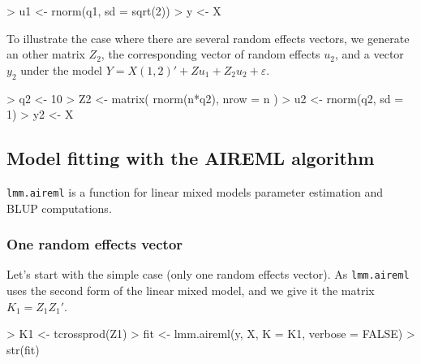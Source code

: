 \documentclass{article}
\renewenvironment{Schunk}{\vspace{\topsep}}{\vspace{\topsep}}
\begin{document}
\begin{Schunk}
\begin{Sinput}
> u1 <- rnorm(q1, sd = sqrt(2))
> y <- X %
\end{Sinput}
\end{Schunk}

  To illustrate the case where there are several random effects vectors, we generate an 
  other matrix $Z_2$, the corresponding vector of random effects $u_2$, and a vector $y_2$ 
  under the model $Y = X (1,2)' + Z u_1 + Z_2 u_2 + \varepsilon$.

\begin{Schunk}
\begin{Sinput}
> q2 <- 10
> Z2 <- matrix( rnorm(n*q2), nrow = n ) 
> u2 <- rnorm(q2, sd = 1)
> y2 <- X %
\end{Sinput}
\end{Schunk}

  \subsection{Model fitting with the AIREML algorithm}

  \verb!lmm.aireml! is a function for linear mixed models parameter estimation
  and BLUP computations. 

  \subsubsection{One random effects vector}
  Let's start with the simple case (only one random effects vector).
  As  \verb!lmm.aireml! uses the second form of the linear mixed model,
  and we give it the matrix $K_1 = Z_1 Z_1'$.

\begin{Schunk}
\begin{Sinput}
> K1 <- tcrossprod(Z1)
> fit <- lmm.aireml(y, X, K = K1, verbose = FALSE)
> str(fit)
\end{Sinput}
\end{Schunk}
\end{document}
